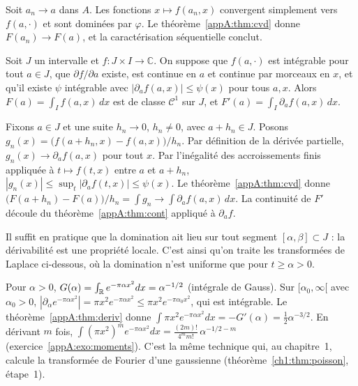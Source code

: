 \begin{humanproof}
Soit $a_n\to a$ dans $A$. Les fonctions $x\mapsto f(a_n,x)$ convergent simplement vers $f(a,\cdot)$ et sont dominées par
$\varphi$. Le théorème~\ref{appA:thm:cvd} donne $F(a_n)\to F(a)$, et la caractérisation séquentielle conclut.
\end{humanproof}

\begin{theorem}\label{appA:thm:deriv}
Soit $J$ un intervalle et $f:J\times I\to\mathbb{C}$. On suppose que $f(a,\cdot)$ est intégrable pour tout $a\in J$, que
$\partial f/\partial a$ existe, est continue en $a$ et continue par morceaux en $x$, et qu'il existe $\psi$ intégrable
avec $|\partial_af(a,x)|\le\psi(x)$ pour tous $a,x$. Alors $F(a)=\int_If(a,x)\,dx$ est de classe $\mathcal C^1$ sur $J$,
et $F'(a)=\int_I\partial_af(a,x)\,dx$.
\end{theorem}

\begin{humanproof}
Fixons $a\in J$ et une suite $h_n\to0$, $h_n\ne0$, avec $a+h_n\in J$. Posons
$g_n(x)=\bigl(f(a+h_n,x)-f(a,x)\bigr)/h_n$. Par définition de la dérivée partielle, $g_n(x)\to\partial_af(a,x)$ pour
tout $x$. Par l'inégalité des accroissements finis appliquée à $t\mapsto f(t,x)$ entre $a$ et $a+h_n$,
$|g_n(x)|\le\sup_t|\partial_af(t,x)|\le\psi(x)$. Le théorème~\ref{appA:thm:cvd} donne
$\bigl(F(a+h_n)-F(a)\bigr)/h_n=\int g_n\to\int\partial_af(a,x)\,dx$. La continuité de $F'$ découle du
théorème~\ref{appA:thm:cont} appliqué à $\partial_af$.
\end{humanproof}

\begin{remark}
Il suffit en pratique que la domination ait lieu sur tout segment $[\alpha,\beta]\subset J$ : la dérivabilité est une
propriété locale. C'est ainsi qu'on traite les transformées de Laplace ci-dessous, où la domination n'est uniforme que
pour $t\ge\alpha>0$.
\end{remark}

\begin{example}\label{appA:ex:moments}
Pour $\alpha>0$, $G(\alpha)=\int_{\mathbb{R}} e^{-\pi\alpha x^2}dx=\alpha^{-1/2}$ (intégrale de Gauss). Sur $[\alpha_0,\infty[$ avec
$\alpha_0>0$, $|\partial_\alpha e^{-\pi\alpha x^2}|=\pi x^2e^{-\pi\alpha x^2}\le\pi x^2e^{-\pi\alpha_0x^2}$, qui est
intégrable. Le théorème~\ref{appA:thm:deriv} donne $\int\pi x^2e^{-\pi\alpha x^2}dx=-G'(\alpha)=\tfrac12\alpha^{-3/2}$.
En dérivant $m$ fois, $\int(\pi x^2)^me^{-\pi\alpha x^2}dx=\frac{(2m)!}{4^mm!}\,\alpha^{-1/2-m}$ (exercice~\ref{appA:exo:moments}).
C'est la même technique qui, au chapitre~1, calcule la transformée de Fourier d'une gaussienne
(théorème~\ref{ch1:thm:poisson}, étape~1).
\end{example}


